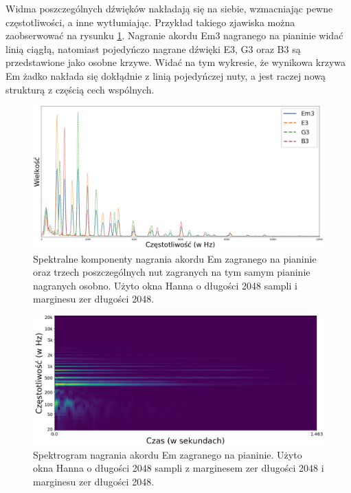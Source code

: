 \documentclass[12pt,a4paper,twoside]{mwart}
\begin{document}
Widma poszczególnych dźwięków nakładają się na siebie, wzmacniając pewne częstotliwości, a inne wytłumiając. Przykład takiego zjawiska można zaobserwować na rysunku \ref{fig:multi:spectra:partials}. Nagranie akordu Em3 nagranego na pianinie widać linią ciągłą, natomiast pojedyńczo nagrane dźwięki E3, G3 oraz B3 są przedstawione jako osobne krzywe. Widać na tym wykresie, że wynikowa krzywa Em żadko nakłada się dokłądnie z linią pojedyńczej nuty, a jest raczej nową strukturą z częścią cech wspólnych.

\begin{figure}[H]
  \begin{center}
    \includegraphics[scale=0.325]{images/Em/spectral_component_em3_partials_2048_512_cropped.png}
    \caption{Spektralne komponenty nagrania akordu Em zagranego na pianinie oraz trzech poszczególnych nut zagranych na tym samym pianinie nagranych osobno. Użyto okna Hanna o długości 2048 sampli i marginesu zer długości 2048.}
    \label{fig:multi:spectra:partials}
  \end{center}
\end{figure}

\begin{figure}[h]
  \begin{center}
    \includegraphics[scale=0.27]{images/Em/spectrogram_Em_2048_512_cropped.png}
    \caption{Spektrogram nagrania akordu Em zagranego na pianinie. Użyto okna Hanna o długości 2048 sampli z marginesem zer długości 2048 i marginesu zer długości 2048.}
    \label{fig:multi:em:spectrogram}
  \end{center}
\end{figure}
\end{document}
